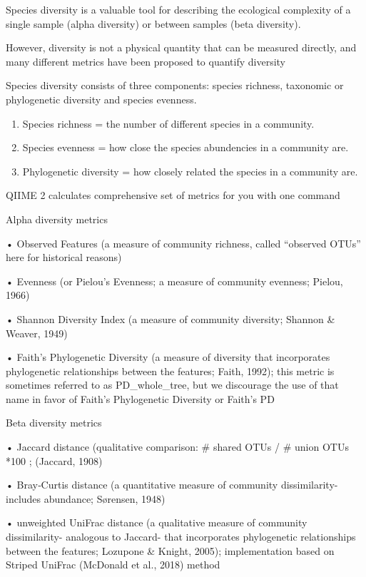 \documentclass[
]{book}
\begin{document}
Species diversity is a valuable tool for describing the ecological complexity of a single sample (alpha diversity) or between samples (beta diversity).

However, diversity is not a physical quantity that can be measured directly, and many different metrics have been proposed to quantify diversity

Species diversity consists of three components: species richness, taxonomic or phylogenetic diversity and species evenness.

\begin{enumerate}
\def\labelenumi{\arabic{enumi}.}
\item
  Species richness = the number of different species in a community.
\item
  Species evenness = how close the species abundencies in a community are.
\item
  Phylogenetic diversity = how closely related the species in a community are.
\end{enumerate}

QIIME 2 calculates comprehensive set of metrics for you with one command

Alpha diversity metrics

• Observed Features (a measure of community richness, called ``observed OTUs'' here for historical reasons)

• Evenness (or Pielou's Evenness; a measure of community evenness; Pielou, 1966)

• Shannon Diversity Index (a measure of community diversity; Shannon \& Weaver, 1949)

• Faith's Phylogenetic Diversity (a measure of diversity that incorporates phylogenetic relationships between the features; Faith, 1992); this metric is sometimes referred to as PD\_whole\_tree, but we discourage the use of that name in favor of Faith's Phylogenetic Diversity or Faith's PD

Beta diversity metrics

• Jaccard distance (qualitative comparison: \# shared OTUs / \# union OTUs *100 ; (Jaccard, 1908)

• Bray‐Curtis distance (a quantitative measure of community dissimilarity- includes abundance; Sørensen, 1948)

• unweighted UniFrac distance (a qualitative measure of community dissimilarity- analogous to Jaccard- that incorporates phylogenetic relationships between the features; Lozupone \& Knight, 2005); implementation based on Striped UniFrac (McDonald et al., 2018) method
\end{document}
